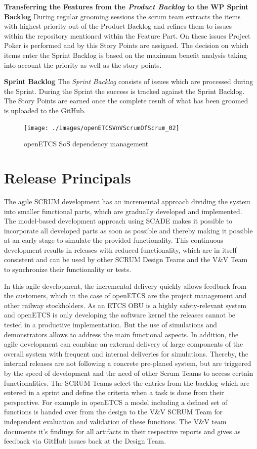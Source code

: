 \textbf{Transferring the Features from the \textit{Product Backlog} to the WP Sprint Backlog}
During regular grooming sessions the scrum team extracts the items with highest priority out of the Product Backlog and refines them to issues within the repository mentioned within the Feature Part.
On these issues Project Poker is performed and by this Story Points are assigned. The decision on which items enter the Sprint Backlog is based on the maximum benefit analysis taking into account the priority as well as the story points.

\textbf{Sprint Backlog}
The \textit{Sprint Backlog} consists of issues which are processed during the Sprint.
During the Sprint the success is tracked against the Sprint Backlog.
The Story Points are earned once the complete result of what has been groomed is uploaded to the GitHub.

\begin{figure}[h]
	\centering
	\texttt{[image: ./images/openETCSVnVScrumOfScrum\_02]}
	\caption{openETCS SoS dependency management}
	\label{fig:openETCSVnVScrumOfScrum}
\end{figure}

\chapter{Release Principals}
\label{sec:Releases}

The agile SCRUM development has an incremental approach dividing the system into smaller functional parts, which are gradually developed and implemented. The model-based development approach using SCADE makes it possible to incorporate all developed parts as soon as possible and thereby making it possible at an early stage to simulate the provided functionality. This continuous development results in releases with reduced functionality, which are in itself consistent and can be used by other SCRUM Design Teams and the V\&V Team to synchronize their functionality or tests.

In this agile development, the incremental delivery quickly allows feedback from the customers, which in the case of openETCS are the project management and other railway stockholders. As an ETCS OBU is a highly safety-relevant system and openETCS is only developing the software kernel the releases cannot be tested in a productive implementation. But the use of simulations and demonstrators allows to address the main functional aspects. In addition, the agile development can combine an external delivery of large components of the overall system with frequent and internal deliveries for simulations. Thereby, the internal releases are not following a concrete pre-planed system, but are triggered by the speed of development and the need of other Scrum Teams to access certain functionalities. The SCRUM Teams select the entries from the backlog which are entered in a sprint and define the criteria when a task is done from their perspective. For example in openETCS a model including a defined set of functions is handed over from the design to the V\&V SCRUM Team for independent evaluation and validation of these functions. The V\&V team documents it's findings for all artifacts in their respective reports and gives as feedback via GitHub issues back at the Design Team.  

